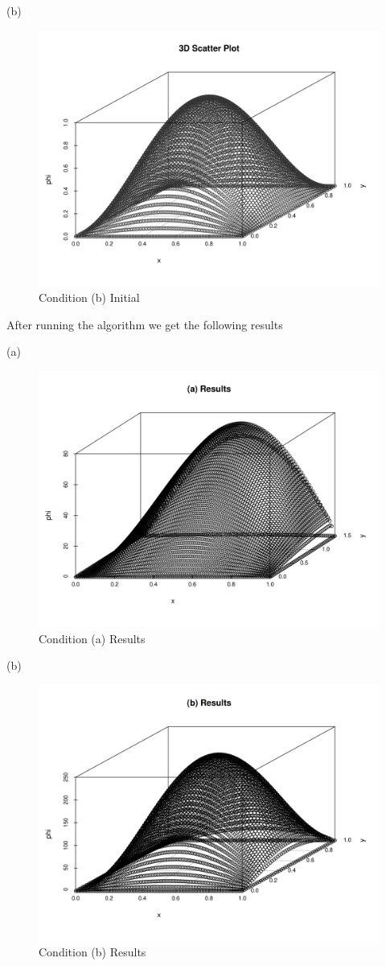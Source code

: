 \documentclass[prb,twocolumn]{revtex4-2}
\begin{document}
(b)

\begin{figure}[H]
    \centerline{\includegraphics [width=3 in] {p1/p1b_init.png}}
    \caption{Condition (b) Initial} \label{q1}
\end{figure}

After running the algorithm we get the following results

(a)

\begin{figure}[H]
    \centerline{\includegraphics [width=3 in] {p1/p1a}}
    \caption{Condition (a) Results} \label{q1}
\end{figure}

(b)

\begin{figure}[H]
    \centerline{\includegraphics [width=3 in] {p1/p1b}}
    \caption{Condition (b) Results} \label{q1}
\end{figure}
\end{document}
